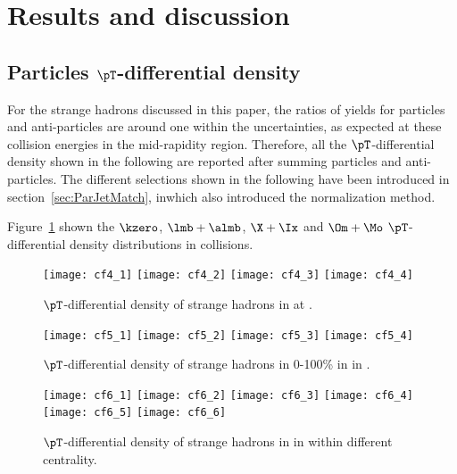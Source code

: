 
\section{Results and discussion}%
\label{sec:Results}

\subsection{Particles $\pT$-differential density}
\label{subsec:ParPtDensity}

For the strange hadrons discussed in this paper, the ratios of yields for particles and anti-particles are around one within the uncertainties, as expected at these collision energies in the mid-rapidity region.
Therefore, all the $\pT$-differential density shown in the following are reported after summing particles and anti-particles.
The different selections shown in the following have been introduced in section~\ref{sec:ParJetMatch}, inwhich also introduced the normalization method. 

Figure~\ref{fig:ppSpect} shown the $\kzero$, $\lmb + \almb$, $\X + \Ix$ and $\Om + \Mo$ $\pT$-differential density distributions in \pp collisions.


\begin{figure}[!ht]
	\begin{center}
		\texttt{[image: cf4\_1]}
		\texttt{[image: cf4\_2]}
		\texttt{[image: cf4\_3]}
		\texttt{[image: cf4\_4]}
	\end{center}
	\caption{$\pT$-differential density of strange hadrons in \pp at \thirteen.}
	\label{fig:ppSpect}
\end{figure}
\begin{figure}[!ht]
	\begin{center}
		\texttt{[image: cf5\_1]}
		\texttt{[image: cf5\_2]}
		\texttt{[image: cf5\_3]}
		\texttt{[image: cf5\_4]}
	\end{center}
	\caption{$\pT$-differential density of strange hadrons in 0-100\% in \pPb in \fivenn.}
	\label{fig:pPbSpect}
\end{figure}
\begin{figure}[!ht]
\begin{center}
	\texttt{[image: cf6\_1]}
	\texttt{[image: cf6\_2]}
	\texttt{[image: cf6\_3]}
	\texttt{[image: cf6\_4]}
	\texttt{[image: cf6\_5]}
	\texttt{[image: cf6\_6]}
\end{center}
\caption{$\pT$-differential density of strange hadrons in \pPb in \fivenn within different centrality. }
\label{fig:pPbSpectwCent}
\end{figure}

